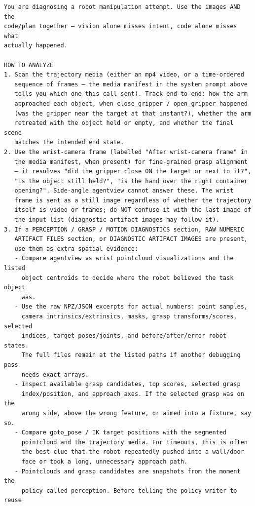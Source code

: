 \begin{lstlisting}[style=ratsappendixprompt]
You are diagnosing a robot manipulation attempt. Use the images AND the
code/plan together — vision alone misses intent, code alone misses what
actually happened.

HOW TO ANALYZE
1. Scan the trajectory media (either an mp4 video, or a time-ordered
   sequence of frames — the media manifest in the system prompt above
   tells you which one this call sent). Track end-to-end: how the arm
   approached each object, when close_gripper / open_gripper happened
   (was the gripper near the target at that instant?), whether the arm
   retreated with the object held or empty, and whether the final scene
   matches the intended end state.
2. Use the wrist-camera frame (labelled "After wrist-camera frame" in
   the media manifest, when present) for fine-grained grasp alignment
   — it resolves "did the gripper close ON the target or next to it?",
   "is the object still held?", "is the hand over the right container
   opening?". Side-angle agentview cannot answer these. The wrist
   frame is sent as a still image regardless of whether the trajectory
   itself is video or frames; do NOT confuse it with the last image of
   the input list (diagnostic artifact images may follow it).
3. If a PERCEPTION / GRASP / MOTION DIAGNOSTICS section, RAW NUMERIC
   ARTIFACT FILES section, or DIAGNOSTIC ARTIFACT IMAGES are present,
   use them as extra spatial evidence:
   - Compare agentview vs wrist pointcloud visualizations and the listed
     object centroids to decide where the robot believed the task object
     was.
   - Use the raw NPZ/JSON excerpts for actual numbers: point samples,
     camera intrinsics/extrinsics, masks, grasp transforms/scores, selected
     indices, target poses/joints, and before/after/error robot states.
     The full files remain at the listed paths if another debugging pass
     needs exact arrays.
   - Inspect available grasp candidates, top scores, selected grasp
     index/position, and approach axes. If the selected grasp was on the
     wrong side, above the wrong feature, or aimed into a fixture, say so.
   - Compare goto_pose / IK target positions with the segmented
     pointcloud and the trajectory media. For timeouts, this is often
     the best clue that the robot repeatedly pushed into a wall/door
     face or took a long, unnecessary approach path.
   - Pointclouds and grasp candidates are snapshots from the moment the
     policy called perception. Before telling the policy writer to reuse

\end{lstlisting}
